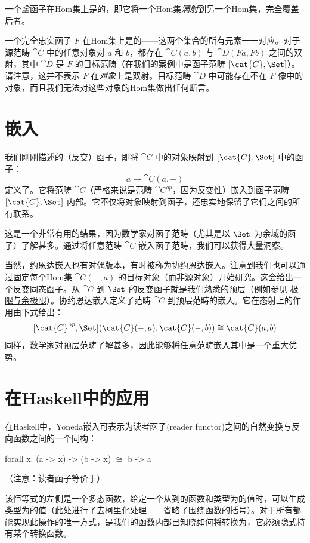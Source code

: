 一个\emph{全}函子在Hom集上是的，即它将一个Hom集\emph{满射}到另一个Hom集，完全覆盖后者。

一个完全忠实函子 $F$ 在Hom集上是的——这两个集合的所有元素一一对应。对于源范畴 $\cat{C}$ 中的任意对象对 $a$ 和 $b$，都存在 $\cat{C}(a, b)$ 与 $\cat{D}(F a, F b)$ 之间的双射，其中 $\cat{D}$ 是 $F$ 的目标范畴（在我们的案例中是函子范畴 $[\cat{C}, \Set]$）。请注意，这并不表示 $F$ 在\emph{对象}上是双射。目标范畴 $\cat{D}$ 中可能存在不在 $F$ 像中的对象，而且我们无法对这些对象的Hom集做出任何断言。

\section{嵌入}

我们刚刚描述的（反变）函子，即将 $\cat{C}$ 中的对象映射到 $[\cat{C}, \Set]$ 中的函子：
$$a \to \cat{C}(a, -)$$
定义了。它将范畴 $\cat{C}$（严格来说是范畴 $\cat{C}^\mathit{op}$，因为反变性）嵌入到函子范畴 $[\cat{C}, \Set]$ 内部。它不仅将对象映射到函子，还忠实地保留了它们之间的所有联系。

这是一个非常有用的结果，因为数学家对函子范畴（尤其是以 $\Set$ 为余域的函子）了解甚多。通过将任意范畴 $\cat{C}$ 嵌入函子范畴，我们可以获得大量洞察。

当然，约恩达嵌入也有对偶版本，有时被称为协约恩达嵌入。注意到我们也可以通过固定每个Hom集 $\cat{C}(-, a)$ 的目标对象（而非源对象）开始研究。这会给出一个反变同态函子。从 $\cat{C}$ 到 $\Set$ 的反变函子就是我们熟悉的预层（例如参见
\hyperref[limits-and-colimits]{极限与余极限}）。协约恩达嵌入定义了范畴 $\cat{C}$ 到预层范畴的嵌入。它在态射上的作用由下式给出：
$$[\cat{C}^\mathit{op}, \Set](\cat{C}(-, a), \cat{C}(-, b)) \cong \cat{C}(a, b)$$
同样，数学家对预层范畴了解甚多，因此能够将任意范畴嵌入其中是一个重大优势。

\section{在Haskell中的应用}

在Haskell中，Yoneda嵌入可表示为读者函子(reader functor)之间的自然变换与反向函数之间的一个同构：

\begin{snipv}
forall x. (a -> x) -> (b -> x) \ensuremath{\cong} b -> a
\end{snipv}
（注意：读者函子等价于）

该恒等式的左侧是一个多态函数，给定一个从到的函数和类型为的值时，可以生成类型为的值（此处进行了去柯里化处理——省略了围绕函数的括号）。对于所有都能实现此操作的唯一方式，是我们的函数内部已知晓如何将转换为，它必须隐式持有某个转换函数。

